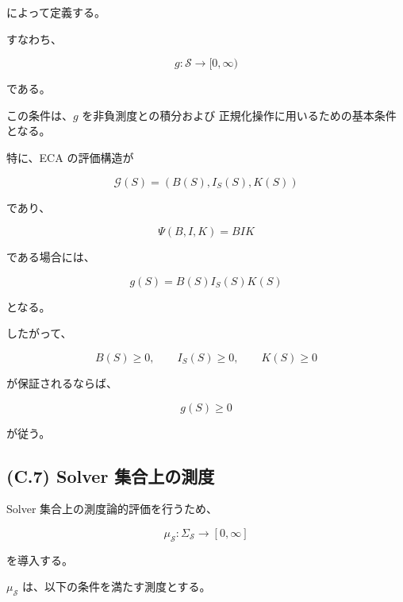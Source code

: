 \documentclass[a4paper,11pt]{article}
\newcommand{\Solver}{\mathcal{S}}
\begin{document}
によって定義する。

すなわち、

\begin{equation}
    g:
    \Solver
    \longrightarrow
    [0,\infty)
\end{equation}

である。

この条件は、$g$ を非負測度との積分および
正規化操作に用いるための基本条件となる。

特に、ECA の評価構造が

\begin{equation}
    \mathcal{G}(S)
    =
    \left(
        B(S),
        I_S(S),
        K(S)
    \right)
\end{equation}

であり、

\begin{equation}
    \Psi(B,I,K)
    =
    BIK
\end{equation}

である場合には、

\begin{equation}
    g(S)
    =
    B(S)I_S(S)K(S)
\end{equation}

となる。

したがって、

\begin{equation}
    B(S)\geq0,
    \qquad
    I_S(S)\geq0,
    \qquad
    K(S)\geq0
\end{equation}

が保証されるならば、

\begin{equation}
    g(S)\geq0
\end{equation}

が従う。


\subsection{(C.7) Solver 集合上の測度}
\label{subsec:C7}

Solver 集合上の測度論的評価を行うため、

\begin{equation}
    \mu_{\Solver}:
    \Sigma_{\Solver}
    \longrightarrow
    [0,\infty]
\end{equation}

を導入する。

$\mu_{\Solver}$ は、以下の条件を満たす測度とする。
\end{document}
